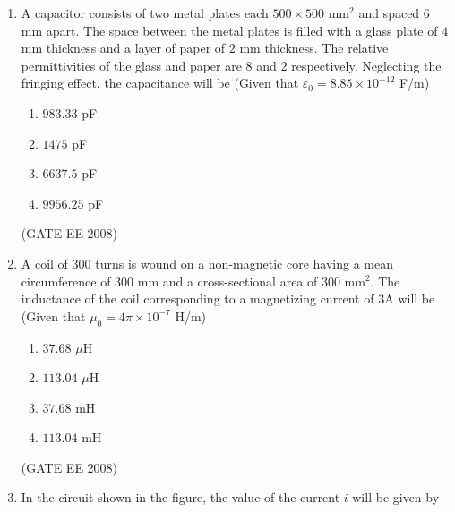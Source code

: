 \documentclass[journal,12pt,onecolumn]{IEEEtran}
\theoremstyle{remark}
\begin{document}
\begin{enumerate}[start=1, label=Q.\arabic*]
\begin{multicols}{4}
\begin{enumerate}[label=(\Alph*)]
    \item $-3$ V
    \item $0$ V
    \item $3$ V
    \item $5$ V
\end{enumerate}
\end{multicols}
\hfill (GATE EE 2008)




\item A capacitor consists of two metal plates each $500 \times 500$ mm$^{2}$ and spaced $6$ mm apart. The space between the metal plates is filled with a glass plate of $4$ mm thickness and a layer of paper of $2$ mm thickness. The relative permittivities of the glass and paper are $8$ and $2$ respectively. Neglecting the fringing effect, the capacitance will be (Given that $\varepsilon_0 = 8.85 \times 10^{-12}$ F/m)

\begin{multicols}{4}
\begin{enumerate}[label=(\Alph*)]
    \item $983.33$ pF
    \item $1475$ pF
    \item $6637.5$ pF
    \item $9956.25$ pF
\end{enumerate}
\end{multicols}
\hfill (GATE EE 2008)

\item A coil of 300 turns is wound on a non-magnetic core having a mean circumference of 300 mm and a cross-sectional area of 300 mm$^{2}$. The inductance of the coil corresponding to a magnetizing current of 3A will be (Given that $\mu_0 = 4\pi \times 10^{-7}$ H/m)

\begin{multicols}{4}
\begin{enumerate}[label=(\Alph*)]
    \item $37.68$ $\mu$H
    \item $113.04$ $\mu$H
    \item $37.68$ mH
    \item $113.04$ mH
\end{enumerate}
\end{multicols}
\hfill (GATE EE 2008)

\item In the circuit shown in the figure, the value of the current $i$ will be given by


\end{enumerate}
\end{document}
